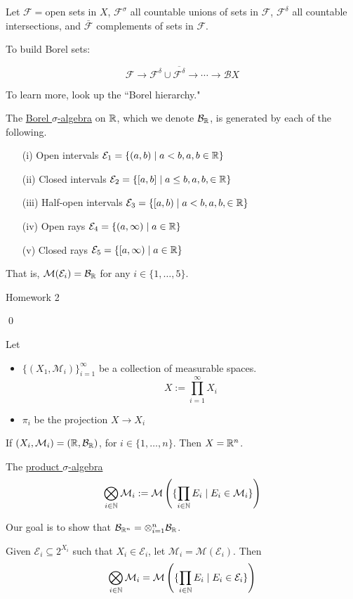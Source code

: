 \documentclass[x11names,reqno,14pt]{extarticle}
\begin{document}
Let $\mathcal{F} = $open sets in $X$, $\mathcal{F}^\sigma$ all countable unions of sets in $\mathcal{F}$, $\mathcal{F}^\delta$ all countable intersections, and $\bar{\mathcal{F}}$ complements of sets in $\mathcal{F}$. 

To build Borel sets: 

\[
\mathcal{F}\to\mathcal{F}^\delta \cup \overline{\mathcal{F}^\delta} \to\cdots \to \mathcal{B}X
\]

To learn more, look up the ``Borel hierarchy." 

\prop The \underline{Borel $\sigma$-algebra} on $\mathbb{R}$, which we denote $\mathcal{B}_{\mathbb{R}}$, is generated by each of the following. 
\begin{itemize}
\item[(i)] Open intervals $\mathcal{E}_1 = \{(a, b) \mid a < b, a, b \in \mathbb{R}\}$
\item[(ii)] Closed intervals $\mathcal{E}_2 = \{[a, b] \mid a \leq b, a,b , \in \mathbb{R}\}$
\item[(iii)] Half-open intervals $\mathcal{E}_3 = \{[a, b) \mid a < b, a, b, \in \mathbb{R}\}$
\item[(iv)] Open rays $\mathcal{E}_4 = \{(a, \infty) \mid a \in \mathbb{R}\}$
\item[(v)] Closed rays $\mathcal{E}_5 = \{[a, \infty) \mid a \in \mathbb{R}\}$
\end{itemize}

That is, $\mathcal{M}(\mathcal{E}_i) = \mathcal{B}_{\mathbb{R}}$ for any $i \in \{1, \dots, 5\}$.

\proof 

Homework 2 

\qed

Let 
\begin{itemize}
\item $\{(X_1, \mathcal{M}_i)\}_{i=1}^\infty$ be a collection of measurable spaces. 
\[
X := \prod_{i=1}^\infty X_i
\]
\item $\pi_i$ be the projection $X \to X_i$
\end{itemize}

\exm If $(X_i, \mathcal{M}_i) = (\mathbb{R}, \mathcal{B}_{\mathbb{R}})$, for $i \in \{1, \dots, n\}$. Then $X = \mathbb{R}^n$.


 The \underline{product $\sigma$-algebra}
\[
\bigotimes_{i\in\mathbb{N}} \mathcal{M}_i := \mathcal{M}\left(\{\prod_{i\in\mathbb{N}} E_i \mid E_i \in \mathcal{M}_i\}\right)
\]

Our goal is to show that $\mathcal{B}_{\mathbb{R}^n} = \otimes_{i=1}^n\mathcal{B}_{\mathbb{R}}$. 

\prop Given $\mathcal{E}_i \subseteq 2^{X_i}$ such that $X_i \in \mathcal{E}_i$, let $\mathcal{M}_i = \mathcal{M}(\mathcal{E}_i)$. Then
\[
\bigotimes_{i\in\mathbb{N}} \mathcal{M}_i = \mathcal{M}\left(\{\prod_{i\in\mathbb{N}}E_i \mid E_i \in \mathcal{E}_i\}\right)
\] 
\end{document}
